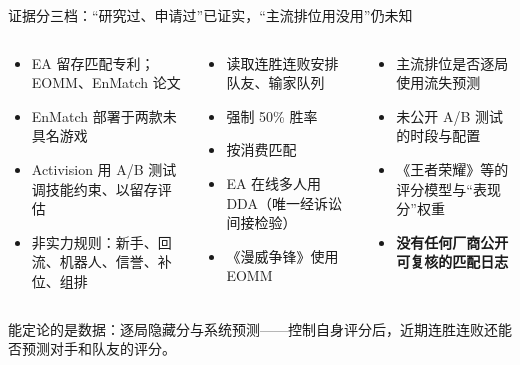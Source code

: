 \documentclass[aspectratio=169,11pt]{beamer}
\newcommand{\tightlist}{\setlength{\itemsep}{2pt}\setlength{\parskip}{0pt}}
\begin{document}
\begin{frame}{证据分三档：“研究过、申请过”已证实，“主流排位用没用”仍未知}
\footnotesize
{}
\begin{columns}[T,onlytextwidth]
\begin{tcolorbox}[evcol,colframe=cAqua,colbacktitle=cAqua,title={已证实}]
\begin{itemize}\tightlist
  \item EA 留存匹配专利；EOMM、EnMatch 论文
  \item EnMatch 部署于两款未具名游戏
  \item Activision 用 A/B 测试调技能约束、以留存评估
  \item 非实力规则：新手、回流、机器人、信誉、补位、组排
\end{itemize}
\end{tcolorbox}
\begin{tcolorbox}[evcol,colframe=cOrange,colbacktitle=cOrange,title={被否认（公司自述）}]
\begin{itemize}\tightlist
  \item 读取连胜连败安排队友、输家队列
  \item 强制 50\% 胜率
  \item 按消费匹配
  \item EA 在线多人用 DDA（唯一经诉讼间接检验）
  \item 《漫威争锋》使用 EOMM
\end{itemize}
\end{tcolorbox}
\begin{tcolorbox}[evcol,colframe=inkMuted,colbacktitle=inkMuted,title={仍然未知}]
\begin{itemize}\tightlist
  \item 主流排位是否逐局使用流失预测
  \item 未公开 A/B 测试的时段与配置
  \item 《王者荣耀》等的评分模型与“表现分”权重
  \item \textbf{没有任何厂商公开可复核的匹配日志}
\end{itemize}
\end{tcolorbox}
\end{columns}
\smallskip
\begin{notebox}
\footnotesize 能定论的是数据：逐局隐藏分与系统预测——控制自身评分后，近期连胜连败还能否预测对手和队友的评分。
\end{notebox}
\end{frame}
\end{document}
